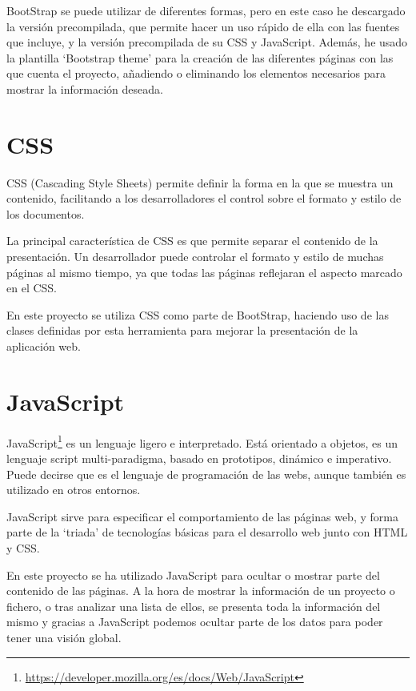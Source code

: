 \documentclass[a4paper, 12pt]{book}
\begin{document}
BootStrap se puede utilizar de diferentes formas, pero en este caso he descargado la versión precompilada, que permite hacer un uso rápido de ella con las fuentes que incluye, y la versión precompilada de su CSS y JavaScript. Además, he usado la plantilla `Bootstrap theme' para la creación de las diferentes páginas con las que cuenta el proyecto, añadiendo o eliminando los elementos necesarios para mostrar la información deseada.

\section{CSS} 
\label{sec:seccion8}
CSS (Cascading Style Sheets) permite definir la forma en la que se muestra un contenido, facilitando a los desarrolladores el control sobre el formato y estilo de los documentos.~\cite{robson:_html_css}

La principal característica de CSS es que permite separar el contenido de la presentación. Un desarrollador puede controlar el formato y estilo de muchas páginas al mismo tiempo, ya que todas las páginas reflejaran el aspecto marcado en el CSS.
    
En este proyecto se utiliza CSS como parte de BootStrap, haciendo uso de las clases definidas por esta herramienta para mejorar la presentación de la aplicación web.

\section{JavaScript} 
\label{sec:seccion9}
JavaScript\footnote{\url{https://developer.mozilla.org/es/docs/Web/JavaScript}} es un lenguaje ligero e interpretado. Está orientado a objetos, es un lenguaje script multi-paradigma, basado en prototipos, dinámico e imperativo. Puede decirse que es el lenguaje de programación de las webs, aunque también es utilizado en otros entornos.

JavaScript sirve para especificar el comportamiento de las páginas web, y forma parte de la `triada' de tecnologías básicas para el desarrollo web junto con HTML y CSS.~\cite{flanagan:_js}

En este proyecto se ha utilizado JavaScript para ocultar o mostrar parte del contenido de las páginas. A la hora de mostrar la información de un proyecto o fichero, o tras analizar una lista de ellos, se presenta toda la información del mismo y gracias a JavaScript podemos ocultar parte de los datos para poder tener una visión global.
\end{document}
